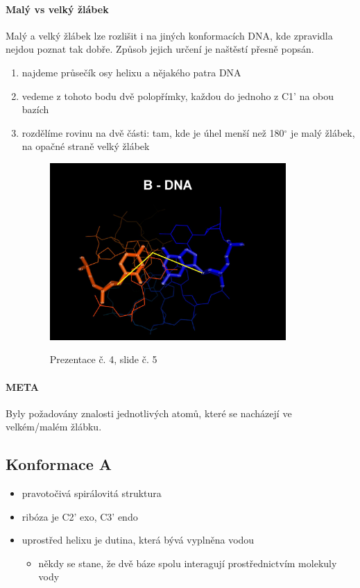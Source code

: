\documentclass[DIV=8]{scrreprt}
\newcommand{\mybox}[2]{
    \paragraph{#1} #2
}
\begin{document}
\mybox{Malý vs velký žlábek}{Malý a velký žlábek lze rozlišit i na jiných konformacích DNA, kde zpravidla nejdou poznat tak dobře. Způsob jejich určení je naštěstí přesně popsán.
\begin{enumerate}[nosep]
    \item najdeme průsečík osy helixu a nějakého patra DNA
    \item vedeme z tohoto bodu dvě polopřímky, každou do jednoho z C1' na obou bazích
    \item rozdělíme rovinu na dvě části: tam, kde je úhel menší než 180\(^{\circ}\) je malý žlábek, na opačné straně velký žlábek \begin{figure}
    \caption{Prezentace č. 4, slide č. 5}
    \includegraphics[width=0.85\textwidth]{slides-4/slide-5.jpg}
    \centering
    \label{slides-4-slide-5}
\end{figure}

\end{enumerate}

}


\mybox{META}{Byly požadovány znalosti jednotlivých atomů, které se nacházejí ve velkém/malém žlábku.}


\subsection{Konformace A} \label{Konformace A}


\begin{itemize}[nosep]
    \item pravotočivá spirálovitá struktura
    \item ribóza je  C2' exo, C3' endo
    \item uprostřed helixu je dutina, která bývá vyplněna vodou
\begin{itemize}[nosep]
    \item někdy se stane, že dvě báze spolu interagují prostřednictvím molekuly vody
\end{itemize}

\end{itemize}
\end{document}
